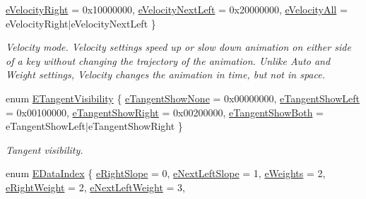 \begin{DoxyCompactItemize}
\hyperlink{class_fbx_anim_curve_def_a747576beffa78ab236d2e140da395fffa1265ff9732df8deb70ee9822af11b995}{e\+Velocity\+Right} = 0x10000000, 
\hyperlink{class_fbx_anim_curve_def_a747576beffa78ab236d2e140da395fffac10e4a2ea06592874b83d4389dcaf560}{e\+Velocity\+Next\+Left} = 0x20000000, 
\hyperlink{class_fbx_anim_curve_def_a747576beffa78ab236d2e140da395fffab8603ba4ecc238f5dee7489b6a0123ee}{e\+Velocity\+All} = e\+Velocity\+Right$\vert$e\+Velocity\+Next\+Left
 \}\begin{DoxyCompactList}\small\item\em Velocity mode. Velocity settings speed up or slow down animation on either side of a key without changing the trajectory of the animation. Unlike Auto and Weight settings, Velocity changes the animation in time, but not in space. \end{DoxyCompactList}
\item 
enum \hyperlink{class_fbx_anim_curve_def_a70c49072776ac6b3426c57dd80e16e3b}{E\+Tangent\+Visibility} \{ \hyperlink{class_fbx_anim_curve_def_a70c49072776ac6b3426c57dd80e16e3ba88013fc4cb5832cd963bd7b5a640ee1c}{e\+Tangent\+Show\+None} = 0x00000000, 
\hyperlink{class_fbx_anim_curve_def_a70c49072776ac6b3426c57dd80e16e3bafc33bb613976689a8f49fe80eca8de02}{e\+Tangent\+Show\+Left} = 0x00100000, 
\hyperlink{class_fbx_anim_curve_def_a70c49072776ac6b3426c57dd80e16e3ba7392f6d6b65c19bce64032708c6a81ff}{e\+Tangent\+Show\+Right} = 0x00200000, 
\hyperlink{class_fbx_anim_curve_def_a70c49072776ac6b3426c57dd80e16e3ba9288cf3a65d5ee1c1bf50d1be8cb9ecc}{e\+Tangent\+Show\+Both} = e\+Tangent\+Show\+Left$\vert$e\+Tangent\+Show\+Right
 \}\begin{DoxyCompactList}\small\item\em Tangent visibility. \end{DoxyCompactList}
\item 
enum \hyperlink{class_fbx_anim_curve_def_a3be261d961f8226235529b148cf80300}{E\+Data\+Index} \{ \newline
\hyperlink{class_fbx_anim_curve_def_a3be261d961f8226235529b148cf80300a97c20bbd5b06a532773ffd8c88624ec2}{e\+Right\+Slope} = 0, 
\hyperlink{class_fbx_anim_curve_def_a3be261d961f8226235529b148cf80300a3107e2f5903a757095499010eb74d475}{e\+Next\+Left\+Slope} = 1, 
\hyperlink{class_fbx_anim_curve_def_a3be261d961f8226235529b148cf80300a08699f6d2da38b05a490f90841afe5e0}{e\+Weights} = 2, 
\hyperlink{class_fbx_anim_curve_def_a3be261d961f8226235529b148cf80300a83afb43c5a3867c140ede62339f6ccc3}{e\+Right\+Weight} = 2, 
\newline
\hyperlink{class_fbx_anim_curve_def_a3be261d961f8226235529b148cf80300a1fd893ddfdb66ac8a9c6961752362c07}{e\+Next\+Left\+Weight} = 3, 

\end{DoxyCompactItemize}
